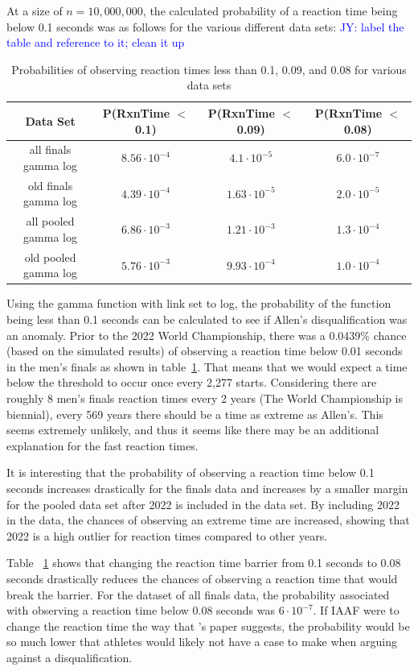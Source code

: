 \documentclass[12pt, letterpaper, titlepage]{article}
\newcommand{\jy}[1]{\textcolor{blue}{JY: #1}}
\begin{document}
At a size of $n=10,000,000$, the calculated probability of a reaction
time being below 0.1 seconds was as follows for the various different data sets:
\jy{label the table and reference to it; clean it up}
\begin{table}
  \centering
  \begin{tabular}{c c c c} 
   \toprule
   Data Set & P(RxnTime $<$ 0.1) & P(RxnTime $<$ 0.09) & P(RxnTime $<$ 0.08) \\ 
   \midrule
   all finals gamma log & $8.56\cdot10^{-4}$ & $4.1\cdot10^{-5}$ & $6.0\cdot10^{-7}$ \\ 
   old finals gamma log & $4.39\cdot10^{-4}$ & $1.63\cdot10^{-5}$ & $2.0\cdot10^{-5}$ \\
   all pooled gamma log & $6.86\cdot10^{-3}$ & $1.21\cdot10^{-3}$ & $1.3\cdot10^{-4}$ \\
   old pooled gamma log & $5.76\cdot10^{-3}$ & $9.93\cdot10^{-4}$ & $1.0\cdot10^{-4}$\\
   \bottomrule
  \end{tabular}
  \caption{Probabilities of observing reaction times less than 0.1, 0.09, and
  0.08 for various data sets}
  \label{tab:Sim_probability}
\end{table}

Using the gamma function with link set to log, the probability of the function being
less than 0.1 seconds can be calculated to see if Allen's disqualification was an anomaly.
Prior to the 2022 World Championship, there was a 0.0439\% chance (based on the
simulated results) of observing a reaction time below 0.01 seconds in the men's
finals as shown in table~\ref{tab:Sim_probability}.
That means that we would expect a time below the threshold to occur
once every 2,277 starts.  Considering there are roughly 8 men's finals reaction
times every 2 years (The World Championship is biennial), every 569 years there
should be a time as extreme as Allen's.  This seems extremely unlikely, and thus
it seems like there may be an additional explanation for the fast reaction times.


It is interesting that the probability of observing a reaction time below 0.1
seconds increases drastically for the finals data and increases by a smaller margin
for the pooled data set after 2022 is included in the data set.  By including 2022
in the data, the chances of observing an extreme time are increased, showing that
2022 is a high outlier for reaction times compared to other years.


Table ~\ref{tab:Sim_probability} shows that changing the reaction time barrier from 0.1 seconds to
0.08 seconds drastically reduces the chances of observing a reaction time that
would break the barrier.  For the dataset of all finals data, the probability
associated with observing a reaction time below 0.08 seconds was $6\cdot10^{-7}$.
If IAAF were to change the reaction time the way that \citet{komi2009iaaf}'s paper
suggests, the probability would be so much lower that athletes would likely not
have a case to make when arguing against a disqualification.
\end{document}
